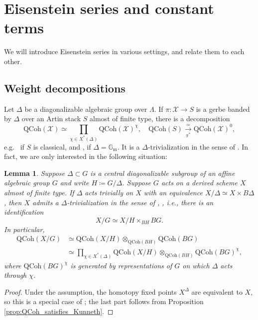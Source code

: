 \documentclass{amsart}
\newtheorem{lemma}[theorem]{Lemma}
\theoremstyle{definition}
\theoremstyle{remark}
\numberwithin{equation}{section}
\newcommand{\mc}{\mathcal}
\newcommand{\Gm}{{\mathbb{G}_{\mathrm{m}}}}
\newcommand{\QCoh}{\mathrm{QCoh}}
\begin{document}
\section{Eisenstein series and constant terms}{\label{s: EisandCT}}

We will introduce Eisenstein series in various settings, and relate them to each other. 

\subsection{Weight decompositions}{\label{ss: weightdecomposition}}
Let $\Delta$ be a diagonalizable algebraic group over $\Lambda$. If $\pi\colon \mc X\to S$ is a gerbe banded by $\Delta$ over an Artin stack $S$ almost of finite type, there is a decomposition
\[
\QCoh(\mc X) \simeq \prod_{\chi\in X^*(\Delta)}\QCoh(\mc X)^\chi,  \quad  \QCoh(S)\xrightarrow[\pi^*]{\simeq}\QCoh(\mc X)^0, 
\]
e.g.~\cite[Theorem 5.4, Proposition 5.7]{BerghSchnurer} if $S$ is classical, and \cite[Theorem 5.25]{BindaPorta}, \cite[Lemma 1.5.3]{HalpernLeistner} if $\Delta=\Gm$.
It is a $\Delta$-trivialization in the sense of \cite[Definition A.19]{BCHNconstructible}. In fact, we are only interested in the following situation:

\begin{lemma}
Suppose $\Delta\subset G$ is a central diagonalizable subgroup of an affine algebraic group $G$ and write $H\coloneq G/\Delta$. 
Suppose $G$ acts on a derived scheme $X$ almost of finite type. If $\Delta$ acts trivially on $X$ with an equivalence $X/\Delta\simeq X\times B\Delta$, then $X$ admits a $\Delta$-trivialization in the sense of \cite[Definition 4.1.1]{Chenequivariant}, \cite[Definition A.16]{BCHNconstructible}, i.e., there is an identification
\[
X/G \simeq X/H\times_{BH}BG. 
\]
In particular, 
\begin{align*}
\QCoh(X/ G)&\simeq \QCoh(X/H)\otimes_{\QCoh(BH)}\QCoh(B G) \\
&\simeq \prod_{\chi\in X^*(\Delta)}\QCoh(X/H)\otimes_{\QCoh(BH)} \QCoh(B G)^{\chi},     
\end{align*}
where $\QCoh(BG)^\chi$ is generated by representations of $G$ on which $\Delta$ acts through $\chi$. 
\end{lemma}

\begin{proof}
Under the assumption, the homotopy fixed points $X^\Delta$ are equivalent to $X$, so this is a special case of \cite[Proposition A.17]{BCHNconstructible}; the last part follows from Proposition \ref{prop:QCoh_satisfies_Kunneth}.  
\end{proof}
\end{document}
